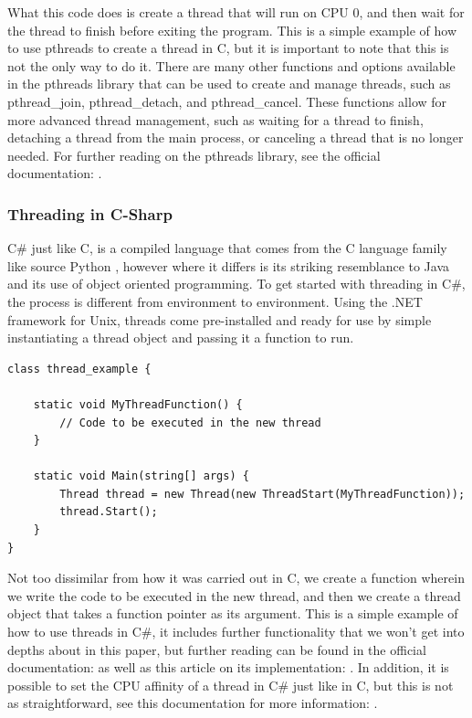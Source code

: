 \documentclass[12pt,a4paper]{article}
\begin{document}
What this code does is create a thread that will run on CPU 0, and then wait for the thread to finish before exiting the program. This is a simple example of how to use pthreads to create a thread in C, but it is important to note that this is not the only way to do it. There are many other functions and options available in the pthreads library that can be used to create and manage threads, such as pthread\_join, pthread\_detach, and pthread\_cancel. These functions allow for more advanced thread management, such as waiting for a thread to finish, detaching a thread from the main process, or canceling a thread that is no longer needed. For further reading on the pthreads library, see the official documentation: .

\subsubsection{Threading in C-Sharp}

C\# just like C, is a compiled language that comes from the C language family like source Python \parencite{PythonFAQ}, however where it differs is its striking resemblance to Java and its use of object oriented programming. To get started with threading in C\#, the process is different from environment to environment. Using the .NET framework for Unix, threads come pre-installed and ready for use by simple instantiating a thread object and passing it a function to run. 

\begin{verbatim}
class thread_example {

    static void MyThreadFunction() {
        // Code to be executed in the new thread
    }

    static void Main(string[] args) {
        Thread thread = new Thread(new ThreadStart(MyThreadFunction));
        thread.Start();
    }
}
\end{verbatim}

Not too dissimilar from how it was carried out in C, we create a function wherein we write the code to be executed in the new thread, and then we create a thread object that takes a function pointer as its argument. This is a simple example of how to use threads in C\#, it includes further functionality that we won't get into depths about in this paper, but further reading can be found in the official documentation:  as well as this article on its implementation: . In addition, it is possible to set the CPU affinity of a thread in C\# just like in C, but this is not as straightforward, see this documentation for more information: \parencite{CSProcessorAffinity}.
\end{document}
